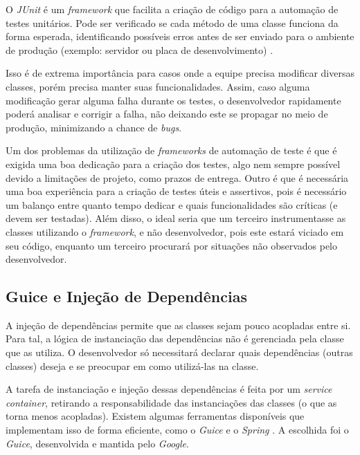       O \textit{JUnit} é um \textit{framework} que facilita a criação de código para a automação de testes unitários. Pode ser verificado se cada método de uma classe funciona da forma esperada, identificando possíveis erros antes de ser enviado para o ambiente de produção (exemplo: servidor ou placa de desenvolvimento) \cite{developer-junit}.

      Isso é de extrema importância para casos onde a equipe precisa modificar diversas classes, porém precisa manter suas funcionalidades. Assim, caso alguma modificação gerar alguma falha durante os testes, o desenvolvedor rapidamente poderá analisar e corrigir a falha, não deixando este se propagar no meio de produção, minimizando a chance de \textit{bugs}.

      Um dos problemas da utilização de \textit{frameworks} de automação de teste é que é exigida uma boa dedicação para a criação dos testes, algo nem sempre possível devido a limitações de projeto, como prazos de entrega. Outro é que é necessária uma boa experiência para a criação de testes úteis e assertivos, pois é necessário um balanço entre quanto tempo dedicar e quais funcionalidades são críticas (e devem ser testadas). Além disso, o ideal seria que um terceiro instrumentasse as classes utilizando o \textit{framework}, e não desenvolvedor, pois este estará viciado em seu código, enquanto um terceiro procurará por situações não observados pelo desenvolvedor.

    \subsection{Guice e Injeção de Dependências}
    \label{methodology:tools:guice}

      A injeção de dependências permite que as classes sejam pouco acopladas entre si. Para tal, a lógica de instanciação das dependências não é gerenciada pela classe que as utiliza. O desenvolvedor só necessitará declarar quais dependências (outras classes) deseja e se preocupar em como utilizá-las na classe.

      A tarefa de instanciação e injeção dessas dependências é feita por um \textit{service container}, retirando a responsabilidade das instanciações das classes (o que as torna menos acopladas). Existem algumas ferramentas disponíveis que implementam isso de forma eficiente, como o \textit{Guice} e o \textit{Spring} \cite{developer-guice}. A escolhida foi o \textit{Guice}, desenvolvida e mantida pelo \textit{Google}.

